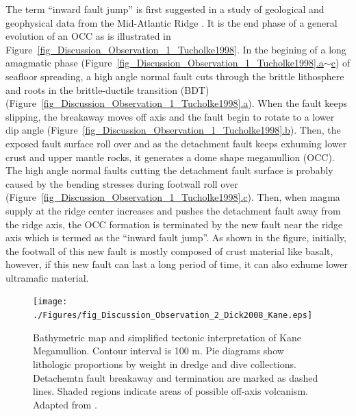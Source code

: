 The term ``inward fault jump'' is first suggested in a study of geological and geophysical data from the Mid-Atlantic Ridge \citep{Tucholke1998}. It is the end phase of a general evolution of an OCC as is illustrated in Figure~\hyperref[fig_Discussion_Observation_1_Tucholke1998]{\ref{fig_Discussion_Observation_1_Tucholke1998}}. In the begining of a long amagmatic phase (Figure~\hyperref[fig_Discussion_Observation_1_Tucholke1998]{\ref{fig_Discussion_Observation_1_Tucholke1998}.a$\sim$c}) of seafloor spreading, a high angle normal fault cuts through the brittle lithosphere and roots in the brittle-ductile transition (BDT) (Figure~\hyperref[fig_Discussion_Observation_1_Tucholke1998]{\ref{fig_Discussion_Observation_1_Tucholke1998}.a}). When the fault keeps slipping, the breakaway moves off axis and the fault begin to rotate to a lower dip angle (Figure~\hyperref[fig_Discussion_Observation_1_Tucholke1998]{\ref{fig_Discussion_Observation_1_Tucholke1998}.b}). Then, the exposed fault surface roll over and as the detachment fault keeps exhuming lower crust and upper mantle rocks, it generates a dome shape megamullion (OCC). The high angle normal faults cutting the detachment fault surface is probably caused by the bending stresses during footwall roll over (Figure~\hyperref[fig_Discussion_Observation_1_Tucholke1998]{\ref{fig_Discussion_Observation_1_Tucholke1998}.c}). Then, when magma supply at the ridge center increases and pushes the detachment fault away from the ridge axis, the OCC formation is terminated by the new fault near the ridge axis which is termed as the ``inward fault jump''. As shown in the figure, initially, the footwall of this new fault is mostly composed of crust material like basalt, however, if this new fault can last a long period of time, it can also exhume lower ultramafic material.

\begin{figure}[h]
 \centering
  \texttt{[image: ./Figures/fig\_Discussion\_Observation\_2\_Dick2008\_Kane.eps]}
 \caption[Bathymetric map and simplified tectonic interpretation of Kane Megamullion. Adapted from \citep{Dick2008}.]{Bathymetric map and simplified tectonic interpretation of Kane Megamullion. Contour interval is 100 m. Pie diagrams show lithologic proportions by weight in dredge and dive collections. Detachemtn fault breakaway and termination are marked as dashed lines. Shaded regions indicate areas of possible off-axis volcanism. Adapted from \citep{Dick2008}.}
 \label{fig_Discussion_Observation_2_Dick2008_Kane}
\end{figure}

